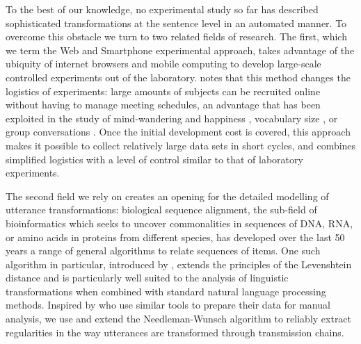 To the best of our knowledge, no experimental study so far has described sophisticated transformations at the sentence level in an automated manner. 
To overcome this obstacle we turn to two related fields of research. The
first, which we term the Web and Smartphone experimental approach, %
takes advantage of the ubiquity of internet browsers and mobile computing to develop
large-scale controlled experiments out of the laboratory.
\textcite{miller_smartphone_2012} %
notes that this method changes the logistics %
of experiments: large amounts of subjects can be recruited online without
having to manage meeting schedules, %
an advantage
that has been exploited in the study of mind-wandering and happiness
\autocites{killingsworth_wandering_2010}{mackerron_happiness_2013}{bastian_language_2017},
 vocabulary size
\autocites{keuleers_word_2015}{brysbaert_how_2016}, %
or group conversations \autocite[][which also involves many subjects simultaneously]{niculae_conversational_2016}.
Once the initial development cost is covered, this approach makes it
possible to collect relatively large data sets in short cycles, and
combines simplified logistics with a level of control similar to that of
laboratory experiments.

The second field we rely on creates an opening for the detailed
modelling of utterance transformations: biological sequence alignment,
the sub-field of bioinformatics which seeks to uncover commonalities in
sequences of DNA, RNA, or amino acids in proteins from different
species, has developed over the last 50 years a range of general
algorithms to relate sequences of items. One such algorithm in
particular, introduced by \textcite{needleman_general_1970}, extends the
principles of the Levenshtein distance and is particularly well suited
to the analysis of linguistic transformations when combined with
standard natural language processing methods. Inspired by
\textcite{lauf_analyzing_2013} who use similar tools to prepare their
data for manual analysis, we use and extend the Needleman-Wunsch
algorithm to reliably extract regularities in the way utterances are
transformed through transmission chains.
